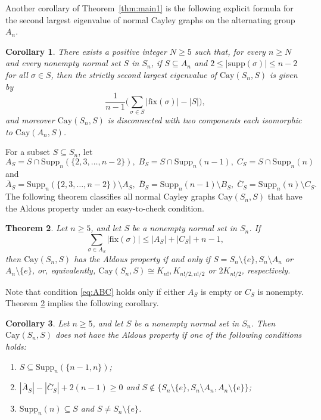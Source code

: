 \documentclass[12pt, a4paper]{article}
\def\fix{\mathrm{fix}}
\newtheorem{thm}{Theorem}[section]
\newtheorem{cor}[thm]{Corollary}
\theoremstyle{definition}
\begin{document}
Another corollary of Theorem~\ref{thm:main1} is the following explicit formula for the second largest eigenvalue of normal Cayley graphs on the alternating group $A_n$.


\begin{cor}\label{An-sec-eigen}
There exists a positive integer $N \ge 5$ such that, for every $n \ge N$ and every nonempty normal set $S$ in $S_n$, if $S \subseteq A_n$ and $2 \le |\mathrm{supp}(\sigma)| \le n-2$ for all $\sigma \in S$, then the strictly second largest eigenvalue of $\mathrm{Cay}(S_n, S)$ is given by
$$
\frac{1}{n-1} \big(\sum_{\sigma \in S} |\fix(\sigma)| - |S| \big),
$$
and moreover $\mathrm{Cay}(S_n, S)$ is disconnected with two components each isomorphic to $\mathrm{Cay}(A_n, S)$. 
\end{cor}

For a subset $S \subseteq S_n$, let
\begin{equation}
\label{eq:ABCS}
A_S = S \cap \mathrm{Supp}_n(\{2,3,\ldots,n-2\}),\; B_S = S \cap \mathrm{Supp}_n(n-1),\; C_S = S \cap \mathrm{Supp}_n(n)
\end{equation}
and
\begin{equation}
\label{eq:barABCS}
\overline{A}_S = \mathrm{Supp}_n(\{2,3,\ldots,n-2\}) \setminus A_S,\; \overline{B}_S = \mathrm{Supp}_n(n-1)\setminus B_S,\; \overline{C}_S = \mathrm{Supp}_n(n)\setminus C_S.
\end{equation}
The following theorem classifies all normal Cayley graphs $\mathrm{Cay}(S_n, S)$ that have the Aldous property under an easy-to-check condition.

\begin{thm}\label{thm:main2}
Let $n\ge 5$, and let $S$ be a nonempty normal set in $S_n$. If  
\begin{equation}
\label{eq:ABC}
\sum_{\sigma\in A_S} |\fix(\sigma)| \le |A_S|+|C_S|+n-1,
\end{equation}
then $\mathrm{Cay}(S_n, S)$ has the Aldous property if and only if $S = S_n\setminus\{e\}, S_n\setminus A_n$ or $A_n\setminus\{e\}$, or, equivalently, $\mathrm{Cay}(S_n,S)\cong K_{n!}, K_{n!/2,n!/2}$ or $2K_{n!/2}$, respectively.
\end{thm}

Note that condition \eqref{eq:ABC} holds only if either $A_S$ is empty or $C_S$ is nonempty. Theorem \ref{thm:main2} implies the following corollary.

\begin{cor}\label{cor:main2}
Let $n\ge 5$, and let $S$ be a nonempty normal set in $S_n$. Then $\mathrm{Cay}(S_n,S)$ does not have the Aldous property if one of the following conditions holds:
\begin{enumerate}[\rm (a)]
\item $S \subseteq \mathrm{Supp}_n(\{n-1,n\})$;
\item $|\overline{A}_S|-|\overline{C}_S|+2(n-1) \ge 0$ and $S \notin \{S_n\setminus\{e\}, S_n\setminus A_n, A_n\setminus\{e\}\}$;
\item $\mathrm{Supp}_n(n)\subseteq S$ and $S \neq S_n\setminus\{e\}$.
\end{enumerate}
\end{cor}
\end{document}
